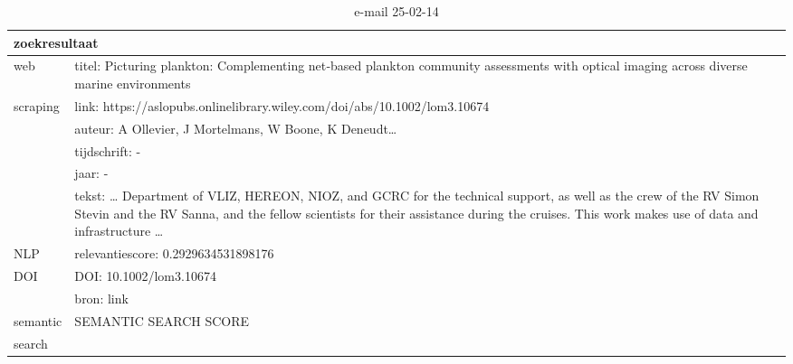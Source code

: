 \begin{table}[h!]
    \caption{e-mail 25-02-14}
    \centering
    \begin{tabularx}{\textwidth}{|p{4cm}|X|} 
        \hline
        \multicolumn{2}{|X|}{\textbf{zoekresultaat}} \\
        \hline
        web &titel: Picturing plankton: Complementing net‐based plankton community assessments with optical imaging across diverse marine environments\\
        scraping&link: https://aslopubs.onlinelibrary.wiley.com/doi/abs/10.1002/lom3.10674\\
        &auteur: A Ollevier, J Mortelmans, W Boone, K Deneudt…\\
        &tijdschrift: -\\
        &jaar: -\\
        &tekst: … Department of VLIZ, HEREON, NIOZ, and GCRC for the technical support, as well as the crew of the RV Simon Stevin and the RV Sanna, and the fellow scientists for their assistance during the cruises. This work makes use of data and infrastructure …\\
        \hline
        NLP&relevantiescore: 0.2929634531898176\\
        \hline
        DOI&DOI: 10.1002/lom3.10674\\
        &bron: link\\
        \hline
        semantic&SEMANTIC SEARCH SCORE\\
        search&\\
        \hline
    \end{tabularx}
    \label{table:email20250214}
\end{table}
